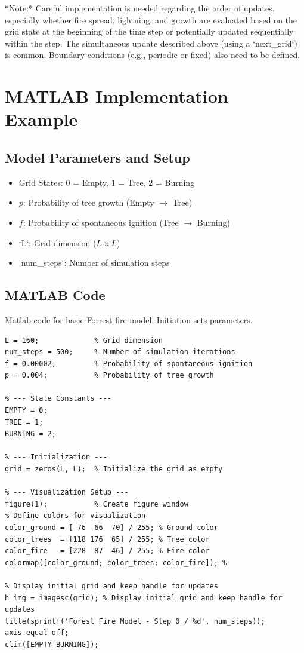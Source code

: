 \documentclass{article}
\begin{document}
*Note:* Careful implementation is needed regarding the order of updates, especially whether fire spread, lightning, and growth are evaluated based on the grid state at the beginning of the time step or potentially updated sequentially within the step. The simultaneous update described above (using a `next\_grid`) is common. Boundary conditions (e.g., periodic or fixed) also need to be defined.


\section{MATLAB Implementation Example}



\subsection{Model Parameters and Setup}
\begin{itemize}
    \item Grid States: $0$ = Empty, $1$ = Tree, $2$ = Burning
    \item $p$: Probability of tree growth (Empty $\to$ Tree)
    \item $f$: Probability of spontaneous ignition (Tree $\to$ Burning)
    \item `L`: Grid dimension ($L \times L$)
    \item `num\_steps`: Number of simulation steps
\end{itemize}

\subsection{MATLAB Code}
Matlab code for basic Forrest fire model.  Initiation sets parameters. 
\begin{lstlisting}[caption={Initial parameters}]
% --- Simulation Parameters ---
L = 160;             % Grid dimension
num_steps = 500;     % Number of simulation iterations
f = 0.00002;         % Probability of spontaneous ignition 
p = 0.004;           % Probability of tree growth 

% --- State Constants ---
EMPTY = 0;          
TREE = 1;           
BURNING = 2;        

% --- Initialization ---
grid = zeros(L, L);  % Initialize the grid as empty 

% --- Visualization Setup ---
figure(1);           % Create figure window
% Define colors for visualization
color_ground = [ 76  66  70] / 255; % Ground color
color_trees  = [118 176  65] / 255; % Tree color
color_fire   = [228  87  46] / 255; % Fire color
colormap([color_ground; color_trees; color_fire]); %

% Display initial grid and keep handle for updates
h_img = imagesc(grid); % Display initial grid and keep handle for updates
title(sprintf('Forest Fire Model - Step 0 / %d', num_steps));
axis equal off;      
clim([EMPTY BURNING]); 

\end{lstlisting}
\end{document}
